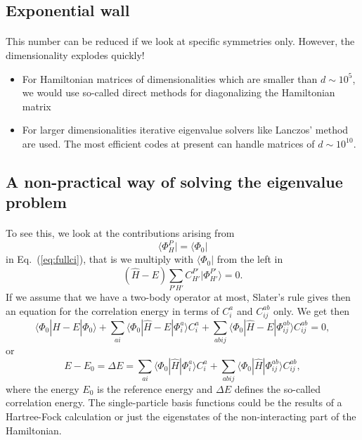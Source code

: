 \subsection*{Exponential wall}

\paragraph{}
This number can be reduced if we look at specific symmetries only. However, the dimensionality explodes quickly!

\begin{itemize}
\item For Hamiltonian matrices of dimensionalities  which are smaller than $d\sim 10^5$, we would use so-called direct methods for diagonalizing the Hamiltonian matrix

\item For larger dimensionalities iterative eigenvalue solvers like Lanczos' method are used. The most efficient codes at present can handle matrices of $d\sim 10^{10}$. 
\end{itemize}

\noindent



\subsection*{A non-practical way of solving the eigenvalue problem}

\paragraph{}
To see this, we look at the contributions arising from 
\[
\langle \Phi_H^P | = \langle \Phi_0|
\]
in  Eq.~(\ref{eq:fullci}), that is we multiply with $\langle \Phi_0 |$
from the left in 
\[
(\hat{H} -E)\sum_{P'H'}C_{H'}^{P'}|\Phi_{H'}^{P'} \rangle=0. 
\]
If we assume that we have a two-body operator at most, Slater's rule gives then an equation for the 
correlation energy in terms of $C_i^a$ and $C_{ij}^{ab}$ only.  We get then
\[
\langle \Phi_0 | \hat{H} -E| \Phi_0\rangle + \sum_{ai}\langle \Phi_0 | \hat{H} -E|\Phi_{i}^{a} \rangle C_{i}^{a}+
\sum_{abij}\langle \Phi_0 | \hat{H} -E|\Phi_{ij}^{ab} \rangle C_{ij}^{ab}=0,
\]
or 
\[
E-E_0 =\Delta E=\sum_{ai}\langle \Phi_0 | \hat{H}|\Phi_{i}^{a} \rangle C_{i}^{a}+
\sum_{abij}\langle \Phi_0 | \hat{H}|\Phi_{ij}^{ab} \rangle C_{ij}^{ab},
\]
where the energy $E_0$ is the reference energy and $\Delta E$ defines the so-called correlation energy.
The single-particle basis functions  could be the results of a Hartree-Fock calculation or just the eigenstates of the non-interacting part of the Hamiltonian.



